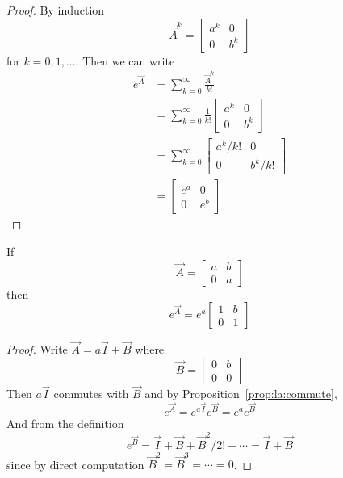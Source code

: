 \begin{proof}
	By induction
	\begin{equation*}
		\vec A^k = 
		\begin{bmatrix}
			a^k & 0 \\
			0 & b^k
		\end{bmatrix}
	\end{equation*}
	for $k = 0, 1, \dotsc$. Then we can write
	\begin{align*}
		e^{\vec A} 	&= \sum_{k = 0}^\infty \frac{\vec A^k}{k!} \\
					&= \sum_{k = 0}^\infty \frac{1}{k!}
					\begin{bmatrix}
						a^k & 0 \\
						0 & b^k
					\end{bmatrix} \\
					&= \sum_{k = 0}^\infty
					\begin{bmatrix}
						a^k / k!	& 0 \\
						0 			& b^k / k!
					\end{bmatrix} \\
					&= 
					\begin{bmatrix}
						e^a & 0 \\
						0 & e^b
					\end{bmatrix}
	\end{align*}
\end{proof}

\begin{proposition}
	\label{prop:la:degenerate}
	If
	\begin{equation*}
		\vec A =
		\begin{bmatrix}
			a & b \\
			0 & a
		\end{bmatrix}
	\end{equation*}
	then
	\begin{equation*}
		e^{\vec A} = e^a
		\begin{bmatrix}
			1 & b \\
			0 & 1
		\end{bmatrix}
	\end{equation*}
\end{proposition}

\begin{proof}
	Write $\vec A = a \vec I + \vec B$ where
	\begin{equation*}
		\vec B =
		\begin{bmatrix}
			0 & b \\
			0 & 0
		\end{bmatrix}
	\end{equation*}
	Then $a\vec I$ commutes with $\vec B$ and by Proposition~\ref{prop:la:commute},
	\begin{equation*}
		e^{\vec A} = e^{a \vec I}e^{\vec B} = e^{a}e^{\vec B}
	\end{equation*}
	And from the definition
	\begin{equation*}
		e^{\vec B} = \vec I + \vec B + \vec B^2 / 2! + \cdots = \vec I + \vec B
	\end{equation*}
	since by direct computation $\vec B^2 = \vec B^3 = \cdots = 0$.
\end{proof}

